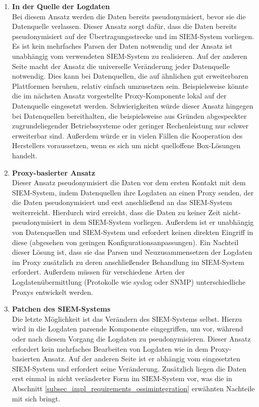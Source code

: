 \begin{enumerate}

\item \textbf{In der Quelle der Logdaten}\\
  Bei diesem Ansatz werden die Daten bereits pseudonymisiert, bevor sie die Datenquelle verlassen. Dieser Ansatz sorgt dafür, dass die Daten bereits pseudonymisiert auf der Übertragungsstrecke und im SIEM-System vorliegen. Es ist kein mehrfaches Parsen der Daten notwendig und der Ansatz ist unabhängig vom verwendeten SIEM-System zu realisieren. Auf der anderen Seite macht der Ansatz die universelle Veränderung jeder Datenquelle notwendig. Dies kann bei Datenquellen, die auf ähnlichen gut erweiterbaren Plattformen beruhen, relativ einfach umzusetzen sein. Beispielsweise könnte die im nächsten Ansatz vorgestellte Proxy-Komponente lokal auf der Datenquelle eingesetzt werden. Schwierigkeiten würde dieser Ansatz hingegen bei Datenquellen bereithalten, die beispielsweise aus Gründen abgespeckter zugrundeliegender Betriebssysteme oder geringer Rechenleistung nur schwer erweiterbar sind. Außerdem würde er in vielen Fällen die Kooperation des Herstellers voraussetzen, wenn es sich um nicht quelloffene \glqq{}Box\grqq{}-Lösungen handelt.

\item \textbf{Proxy-basierter Ansatz}\\
  Dieser Ansatz pseudonymisiert die Daten vor dem ersten Kontakt mit dem SIEM-System, indem Datenquellen ihre Logdaten an einen Proxy senden, der die Daten pseudonymisiert und erst anschließend an das SIEM-System weiterreicht. Hierdurch wird erreicht, dass die Daten zu keiner Zeit nicht-pseudonymisiert in dem SIEM-System vorliegen. Außerdem ist er unabhängig von Datenquellen und SIEM-System und erfordert keinen direkten Eingriff in diese (abgesehen von geringen Konfigurationsanpassungen). Ein Nachteil dieser Lösung ist, dass sie das Parsen und Neuzusammensetzen der Logdaten im Proxy zusätzlich zu deren anschließender Behandlung im SIEM-System erfordert. Außerdem müssen für verschiedene Arten der Logdatenübermittlung (Protokolle wie syslog oder SNMP) unterschiedliche Proxys entwickelt werden.

\item \textbf{Patchen des SIEM-Systems}\\
  Die letzte Möglichkeit ist das Verändern des SIEM-Systems selbst. Hierzu wird in die Logdaten parsende Komponente eingegriffen, um vor, während oder nach diesem Vorgang die Logdaten zu pseudonymisieren. Dieser Ansatz erfordert kein mehrfaches Bearbeiten von Logdaten wie in dem Proxy-basierten Ansatz. Auf der anderen Seite ist er abhängig vom eingesetzten SIEM-System und erfordert seine Veränderung. Zusätzlich liegen die Daten erst einmal in nicht veränderter Form im SIEM-System vor, was die in Abschnitt \ref{subsec_impl_requirements_ossimintegration} erwähnten Nachteile mit sich bringt.

\end{enumerate}

